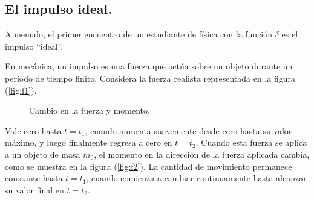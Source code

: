 \subsection{El impulso ideal.}

A menudo, el primer encuentro de un estudiante de física con la función $\delta$ es el impulso \enquote{ideal}.
\par
En mecánica, un impulso es una fuerza que actúa sobre un objeto durante un período de tiempo finito. Considera la fuerza realista representada en la figura (\ref{fig:f1}).

\begin{figure}[H]
\centering
{}
\caption{Cambio en la fuerza y momento.}
\end{figure}

Vale cero hasta $t = t_{1}$, cuando aumenta suavemente desde cero hasta su valor máximo, y luego finalmente regresa a cero en $t = t_{2}$. Cuando esta fuerza se aplica a un objeto de masa $m_{0}$, el momento en la dirección de la fuerza aplicada cambia, como se muestra en la figura (\ref{fig:f2}). La cantidad de movimiento permanece constante hasta $t = t_{1}$, cuando comienza a cambiar continuamente hasta alcanzar su valor final en $t = t_{2}$.

